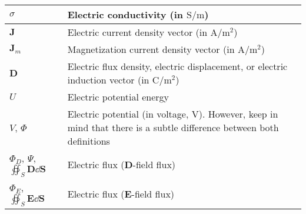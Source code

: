 \begin{xltabular}{\textwidth}{XX}
	\(\sigma\)                                                                                                                      & Electric conductivity (in \(\si{\siemens\per\meter}\))                                                                                                                                   \\ \hline
	\(\mathbf{J}\)                                                                                                                  & Electric current density vector (in \(\si{\ampere\per\square\meter}\))                                                                                                                   \\ \hline
	\(\mathbf{J}_m\)\cite{chengFieldWaveElectromagnetics1989}                                                                       & Magnetization current density vector (in \(\si{\ampere\per\meter\squared}\))                                                                                                             \\ \hline
	\(\mathbf{D}\)                                                                                                                  & Electric flux density, electric displacement, or electric induction vector (in \(\si{\coulomb\per\meter\squared}\))                                                                      \\ \hline
	\(U\)                                                                                                                           & Electric potential energy                                                                                                                                                                \\ \hline
	\(V\)\cite{wiki:electric-potential,chengFieldWaveElectromagnetics1989}, \(\Phi\)\cite{ramoFieldsWavesCommunication1994}         & Electric potential (in voltage, \(\si{\volt}\)). However, keep in mind that there is a subtle difference between both definitions \cite{stackexchange:electric-potential-vs-voltage}     \\ \hline
	\(\Phi_D\)\cite{wiki:D-field-flux}, \(\varPsi\)\cite{ramoFieldsWavesCommunication1994}, \(\oiint_S \mathbf{D} \dd{\mathbf{S}}\) & Electric flux (\(\mathbf{D}\)-field flux)                                                                                                                                                \\ \hline
	\(\Phi_E\)\cite{wiki:electric-flux}, \(\oiint_S \mathbf{E} \dd{\mathbf{S}}\)                                                    & Electric flux (\(\mathbf{E}\)-field flux)                                                                                                                                                \\ \hline

\end{xltabular}
